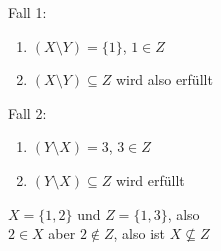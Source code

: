 \documentclass[a4paper, 11pt]{article}
\begin{document}
\begin{minipage}[t]{0.45\textwidth}
Fall 1:
\begin{enumerate}
    \item[] $(X \setminus Y) = \{1\}$, \hspace{0.5cm} $1 \in Z$
    \item[] $(X \setminus Y) \subseteq Z$ wird also erfüllt
\end{enumerate}
\end{minipage}
\hfill
\begin{minipage}[t]{0.45\textwidth}
Fall 2:
\begin{enumerate}
    \item[] $(Y \setminus X) = 3$, \hspace{0.5cm} $3 \in Z$
    \item[] $(Y \setminus X) \subseteq Z$ wird erfüllt 
\end{enumerate}
\end{minipage}

\vspace{0.5cm}
    \begin{center}
    \begin{minipage}{0.4\textwidth}
    $X = \{1, 2\}$ und $Z = \{1, 3\}$, also \\
    $2 \in X$ aber $2 \notin Z$, also ist $X \nsubseteq Z$
    \end{minipage}
    \end{center}
\end{document}
